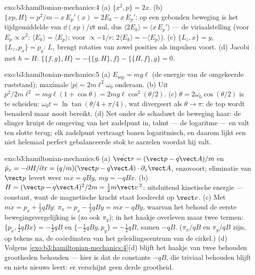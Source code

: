 \begin{solution}{exo:b3:hamiltonian-mechanics:4}
(a) $\{x^2, p\} = 2x$. (b) $\{xp, H\} = p^2/m - x\,E_p'(x) = 2E_k -
x\,E_p'$: op een gebonden beweging is het tijdgemiddelde van $\dd(xp)/\dd t$ nul, dus $\langle 2E_k\rangle = \langle x\,E_p'\rangle$ --- de
viriaalstelling (voor $E_p \propto x^2$: $\langle E_k\rangle = \langle
E_p\rangle$; voor $\propto -1/r$: $2\langle E_k\rangle = -\langle
E_p\rangle$). (c) $\{L_z, x\} = y$, $\{L_z, p_x\} = p_y$: $L_z$ brengt
rotaties van zowel posities als impulsen voort. (d) Jacobi met $h
= H$: $\{\{f, g\}, H\} = -\{\{g, H\}, f\} - \{\{H, f\}, g\} = 0$.
\end{solution}

\begin{solution}{exo:b3:hamiltonian-mechanics:5}
(a) $E_{\text{sep}} = mg\ell$ (de energie van de omgekeerde ruststand);
maximale $|p| = 2m\ell^2\omega_0$ onderaan. (b) Uit
$p^2/2m\ell^2 = mg\ell(1 + \cos\theta) = 2mg\ell\cos^2(\theta/2)$. (c)
$\dot\theta = 2\omega_0\cos(\theta/2)$ is te scheiden: $\omega_0t =
\ln\tan(\theta/4 + \pi/4)$, wat divergeert als $\theta \to \pi$: de top
wordt benaderd maar nooit bereikt. (d) Net onder de  schaduwt
de beweging haar: de slinger kruipt de omgeving van het zadelpunt in,
talmt --- de logaritme --- en valt ten slotte terug; elk zadelpunt
vertraagt banen logaritmisch, en daarom lijkt een niet helemaal perfect
gebalanceerde stok te aarzelen voordat hij valt.
\end{solution}

\begin{solution}{exo:b3:hamiltonian-mechanics:6}
(a) $\dot{\vect r} = (\vect p - q\vect A)/m$ en $\dot p_x =
-\partial H/\partial x = (q/m)(\vect p - q\vect A)\cdot\partial_x\vect
A$, enzovoort; eliminatie van $\vect p$ levert weer $m\ddot x = qB\dot y$, $m\ddot y = -qB\dot x$. (b) $H = (\vect p - q\vect A)^2/2m = \tfrac12
m\vect v^{\,2}$: uitsluitend kinetische energie --- constant, want de
magnetische kracht staat loodrecht op $\vect v$. (c) Met $m\dot x = p_x +
\tfrac12 qBy$: $\pi_x = p_x - \tfrac12 qBy = m\dot x - qBy$, waarvan het
behoud de eerste bewegingsvergelijking is (zo ook $\pi_y$); in het haakje
overleven maar twee termen: $\{p_x, \tfrac12 qBx\} = -\tfrac12
qB$ en $\{-\tfrac12 qBy, p_y\} = -\tfrac12 qB$, samen $-qB$. ($\pi_x/qB$ en $\pi_y/qB$
zijn, op tekens na, de coördinaten van het geleidingscentrum van de
cirkel.) (d) Volgens \cref{exo:b3:hamiltonian-mechanics:4}(d) blijft het
haakje van twee behouden grootheden behouden --- hier is dat de constante
$-qB$, die triviaal behouden blijft en niets nieuws leert: er verschijnt
geen derde grootheid.
\end{solution}

